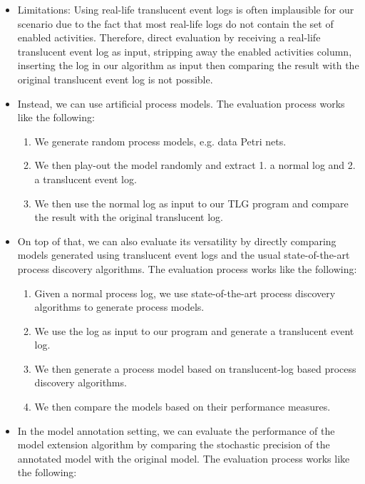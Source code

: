\begin{itemize}

    \item Limitations: Using real-life translucent event logs is often implausible for our scenario due to the fact that most real-life logs do not contain the set of enabled activities. Therefore, direct evaluation by receiving a real-life translucent event log as input, stripping away the enabled activities column, inserting the log in our algorithm as input then comparing the result with the original translucent event log is not possible.

    \item Instead, we can use artificial process models. The evaluation process works like the following: 
    
    \begin{enumerate}
        \item We generate random process models, e.g. data Petri nets.
        \item We then play-out the model randomly and extract  1. a normal log and 2. a translucent event log.
        \item We then use the normal log as input to our TLG program and compare the result with the original translucent log.
    \end{enumerate}

    \item On top of that, we can also evaluate its versatility by directly comparing models generated using translucent event logs and the usual state-of-the-art process discovery algorithms. The  evaluation process works like the following: 
        
    \begin{enumerate}
        \item Given a normal process log, we use state-of-the-art process discovery algorithms to generate process models.
        \item We use the log as input to our program and generate a translucent event log.
        \item We then generate a process model based on translucent-log based process discovery algorithms.
        \item We then compare the models based on their performance measures.
    \end{enumerate}
     
    \item In the model annotation setting, we can evaluate the performance of the model extension algorithm by comparing the stochastic precision of the annotated model with the original model. The evaluation process works like the following:
    

\end{itemize}
